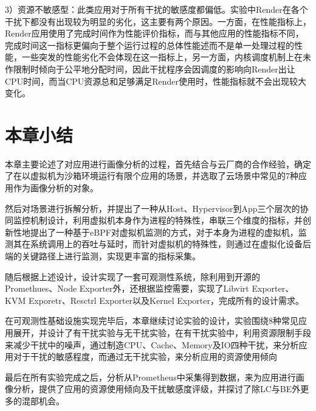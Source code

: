 3）资源不敏感型：此类应用对于所有干扰的敏感度都偏低。实验中Render在各个干扰下都没有出现较为明显的劣化，这主要有两个原因。一方面，在性能指标上，Render应用使用了完成时间作为性能评价指标，而与其他应用的性能指标不同，完成时间这一指标更偏向于整个运行过程的总体性能述而不是单一处理过程的性能，一些突发的性能劣化不会体现在这一指标上，另一方面，内核调度机制上在未作限制时倾向于公平地分配时间，因此干扰程序会因调度的影响向Render出让CPU时间，而当CPU资源总和足够满足Render使用时，性能指标就不会出现较大变化。

\section{本章小结}

本章主要论述了对应用进行画像分析的过程，首先结合与云厂商的合作经验，确定了在以虚拟机为沙箱环境运行有限个应用的场景，并选取了云场景中常见的7种应用作为画像分析的对象。

然后对场景进行拆解分析，并提出了一种从Host、Hypervisor到App三个层次的协同监控机制设计，利用虚拟机本身作为进程的特殊性，串联三个维度的指标，并创新性地提出了一种基于eBPF对虚拟机监测的方式，对于本身为进程的虚拟机，监测其在系统调用上的吞吐与延时，而针对虚拟机的特殊性，则通过在虚拟化设备后端的关键路径上进行监测，实现更丰富的指标采集。

随后根据上述设计，设计实现了一套可观测性系统，除利用到开源的Promethues、Node Exporter外，还根据监控需要，实现了Libvirt Exporter、KVM Exporetr、Resctrl Exporter以及Kernel Exporter，完成所有的设计需求。

在可观测性基础设施实现完毕后，本章继续讨论实验的设计，实验围绕8种常见应用展开，并设计了有干扰实验与无干扰实验，在有干扰实验中，利用资源限制手段来减少干扰中的噪声，通过制造CPU、Cache、Memory及IO四种干扰，来分析应用对于干扰的敏感程度，而通过无干扰实验，来分析应用的资源使用倾向

最后在所有实验完成之后，分析从Prometheus中采集得到数据，来为应用进行画像分析，提供了应用的资源使用倾向及干扰敏感度评级，并探讨了除LC与BE外更多的混部机会。